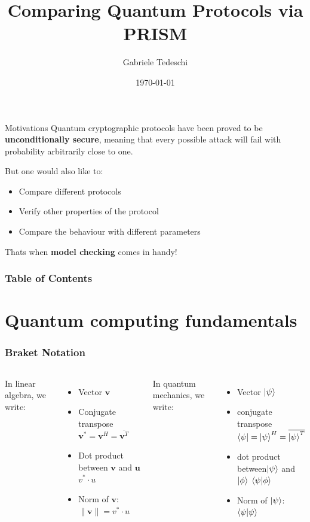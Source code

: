 \documentclass{beamer}
\title{Comparing Quantum Protocols via PRISM}
\author{Gabriele Tedeschi}
\institute{University of Pisa}
\date{\today}
\newcommand{\kp}{\ket{\psi}}
\begin{document}
\frame{\titlepage}

\begin{frame}{Motivations}
Quantum cryptographic protocols have been proved to be \textbf{unconditionally secure}, meaning that every possible attack will fail with probability arbitrarily close to one.

\bigskip
But one would also like to:\begin{itemize}
\item Compare different protocols
\item Verify other properties of the protocol
\item Compare the behaviour with different parameters
\end{itemize}

\bigskip
Thats when \textbf{model checking} comes in handy!
\end{frame}

\begin{frame}
	\frametitle{Table of Contents}
	\tableofcontents
	\end{frame}


\section{Quantum computing fundamentals}
\begin{frame}%
\frametitle{Braket Notation}
\begin{columns}
In linear algebra, we write:
\begin{itemize}
\item Vector $\mathbf{v}$
\item Conjugate transpose $\mathbf{v}^* = \mathbf{v}^H = \overline{\mathbf{v}^T}$
\item Dot product between $\mathbf{v}$ and $\mathbf{u}$ 
\hspace*{1.5cm}$v^* \cdot u$
\item Norm of $\mathbf{v}$: $\|\mathbf{v}\| = v^* \cdot u$

\end{itemize}
\pause
{}
In quantum mechanics, we write:
\begin{itemize}
\item Vector $\ket{\psi}$
\item conjugate transpose $\bra{\psi} = \ket{\psi}^H = \overline{\ket{\psi}^T}$
\item dot product between{\small  $\ket{\psi}$} and {\small $\ket{\phi}$}
\hspace*{1.5cm}$\braket{\psi | \phi}$
\item Norm of $\kp$: $\braket{\psi | \psi}$
\end{itemize}
\end{columns}
\end{frame}
\end{document}
